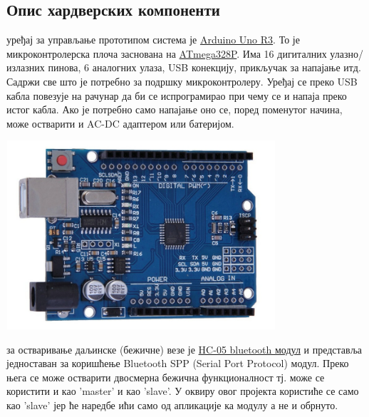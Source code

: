 \documentclass[12pt]{article}
\begin{document}
\subsection{Опис хардверских компоненти}
 уређај за управљање прототипом система је \href{https://store.arduino.cc/products/arduino-uno-rev3}{Arduino Uno R3}. То је микроконтролерска плоча заснована на \href{http://ww1.microchip.com/downloads/en/DeviceDoc/Atmel-7810-Automotive-Microcontrollers-ATmega328P\_Datasheet.pdf}{ATmega328P}. Има 16 дигиталних улазно/излазних пинова, 6 аналогних улаза, USB конекцију, прикључак за напајање итд. Садржи све што је потребно за подршку микроконтролеру. Уређај се преко USB кабла повезује на рачунар да би се испрограмирао при чему се и напаја преко истог кабла. Ако је потребно само напајање оно се, поред поменутог начина, може остварити и AC-DC адаптером или батеријом. 
\begin{center}
    \centering 
    \includegraphics[height=7cm, width=10cm]{images/arduino}
\end{center}
\vspace{0.5cm}
\indent{} за остваривање даљинске (бежичне) везе је \href{https://components101.com/sites/default/files/component\_datasheet/HC-05\%20Datasheet.pdf}{HC-05 bluetooth модул} и представља једноставан за коришћење Bluetooth SPP (Serial Port Protocol) модул. Преко њега се може остварити двосмерна бежична функционалност тј. може се користити и као 'master' и као 'slave'. У оквиру овог пројекта користиће се само као 'slave' јер ће наредбе ићи само од апликације ка модулу а не и обрнуто. 
\vspace{0.5cm}
\end{document}
